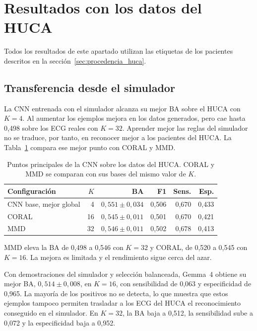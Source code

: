 \section{Resultados con los datos del HUCA}
\label{chap:comparacion_real}

Todos los resultados de este apartado utilizan las etiquetas de los pacientes descritos en la sección~\ref{sec:procedencia_huca}.

\subsection{Transferencia desde el simulador}

La CNN entrenada con el simulador alcanza su mejor BA sobre el HUCA con \(K=4\). Al aumentar los ejemplos mejora en los datos generados, pero cae hasta 0,498 sobre los ECG reales con \(K=32\). Aprender mejor las reglas del simulador no se traduce, por tanto, en reconocer mejor a los pacientes del HUCA. La Tabla~\ref{tab:domain_adaptation_summary} compara ese mejor punto con CORAL y MMD.

\begin{table}[H]
  \centering
  \small
  \begin{tabularx}{0.95\textwidth}{Xrrrrr}
    \toprule
    Configuración & \(K\) & BA & F1 & Sens. & Esp. \\
    \midrule
    CNN base, mejor global & 4 & \(0,551 \pm 0,034\) & 0,506 & 0,670 & 0,433 \\
    CORAL & 16 & \(0,545 \pm 0,011\) & 0,501 & 0,670 & 0,421 \\
    MMD & 32 & \(0,546 \pm 0,011\) & 0,502 & 0,678 & 0,413 \\
    \bottomrule
  \end{tabularx}
  \caption{Puntos principales de la CNN sobre los datos del HUCA. CORAL y MMD se comparan con sus bases del mismo valor de \(K\).}
  \label{tab:domain_adaptation_summary}
  \resultstablenote
\end{table}

MMD eleva la BA de 0,498 a 0,546 con \(K=32\) y CORAL, de 0,520 a 0,545 con \(K=16\). La mejora es limitada y el rendimiento sigue cerca del azar.

Con demostraciones del simulador y selección balanceada, Gemma~4 obtiene su mejor BA, \(0,514 \pm 0,008\), en \(K=16\), con sensibilidad de 0,063 y especificidad de 0,965. La mayoría de los positivos no se detecta, lo que muestra que estos ejemplos tampoco permiten trasladar a los ECG del HUCA el reconocimiento conseguido en el simulador. En \(K=32\), la BA baja a 0,512, la sensibilidad sube a 0,072 y la especificidad baja a 0,952.

